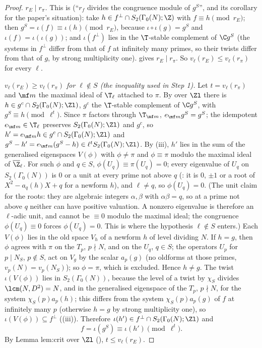 \begin{proof}
\emph{$r_E\mid r_\pi$.} This is  (``$r_f$ divides the congruence module of $g^S$'', and its corollary for the paper's situation): take $h\in f^\perp\cap S_2(\Gamma_0(N);\Z)$ with $f\equiv h\pmod{r_E}$; then
$g^S=\iota(f)\equiv\iota(h)\pmod{r_E}$, because $\iota\circ\iota(g)=g^S$ and $\iota(f)=\iota(\iota(g))$; and $\iota(f^\perp)$ lies in the $\T$-stable complement of $\C g^S$ (the systems in $f^\perp$ differ from that of $f$ at infinitely many
primes, so their twists differ from that of $g$, by strong multiplicity one).  gives $r_E\mid r_\pi$. So $v_\ell(r_E)\le v_\ell(r_\pi)$ for every $\ell$.

\emph{$v_\ell(r_E)\ge v_\ell(r_\pi)$ for $\ell\notin S$ (the inequality used in Step 1).} Let $t=v_\ell(r_\pi)$ and $\mf m$ the maximal ideal of $\T_\ell$ attached to $\pi$. By  over $\Zl$ there is
$h\in g^c\cap S_2(\Gamma_0(N);\Zl)$, $g^c$ the $\T$-stable complement of $\C g^S$, with $g^S\equiv h\pmod{\ell^t}$. Since $\pi$ factors through $\T_{\mf m}$, $e_{\mf m}g^S=g^S$; the idempotent $e_{\mf m}\in\T_\ell$ preserves
$S_2(\Gamma_0(N);\Zl)$ and $g^c$, so $h'=e_{\mf m}h\in g^c\cap S_2(\Gamma_0(N);\Zl)$ and $g^S-h'=e_{\mf m}(g^S-h)\in\ell^tS_2(\Gamma_0(N);\Zl)$. By (iii), $h'$ lies in the sum of the generalised
eigenspaces $V(\phi)$ with $\phi\ne\pi$ and $\phi\equiv\pi$ modulo the maximal ideal of $\overline\Z_\ell$. For such $\phi$ and $q\in S$, $\phi(U_q)\equiv\pi(U_q)=0$; every eigenvalue of $U_q$ on $S_2(\Gamma_0(N))$ is $0$ or a unit at every
prime not above $q$ (: it is $0$, $\pm1$ or a root of $X^2-a_q(h)X+q$ for a newform $h$), and $\ell\ne q$, so $\phi(U_q)=0$. (The unit claim for the roots: they are
algebraic integers $\alpha,\beta$ with $\alpha\beta=q$, so at a prime not above $q$ neither can have positive valuation. A nonzero eigenvalue is therefore an $\ell$-adic unit, and cannot be
$\equiv0$ modulo the maximal ideal; the congruence $\phi(U_q)\equiv0$ forces $\phi(U_q)=0$. This is where the hypothesis $\ell\notin S$ enters.) Each $V(\phi)$ lies in the old space $V_h$ of a newform $h$ of level dividing $N$.
If $h=g$, then $\phi$ agrees with $\pi$ on the $T_p$, $p\nmid N$, and on the $U_q$, $q\in S$; the operators $U_p$ for $p\mid N_S$, $p\notin S$, act on $V_g$ by the scalar $a_p(g)$ (no oldforms at those primes,
$v_p(N)=v_p(N_S)$); so $\phi=\pi$, which is excluded. Hence $h\ne g$. The twist $\iota(V(\phi))$ lies in $S_2(\Gamma_0(N))$, because the level of a twist by $\chi_S$ divides $\lcm(N,D^2)=N$, and in the generalised
eigenspace of the $T_p$, $p\nmid N$, for the system $\chi_S(p)a_p(h)$; this differs from the system $\chi_S(p)a_p(g)$ of $f$ at infinitely many $p$ (otherwise $h=g$ by strong multiplicity one), so
$\iota(V(\phi))\subseteq f^\perp$ ((iii)). Therefore $\iota(h')\in f^\perp\cap S_2(\Gamma_0(N);\Zl)$ and
\[
f=\iota(g^S)\equiv\iota(h')\pmod{\ell^t}.
\]
By Lemma lem:crit over $\Zl$ (), $t\le v_\ell(r_E)$.
\end{proof}

